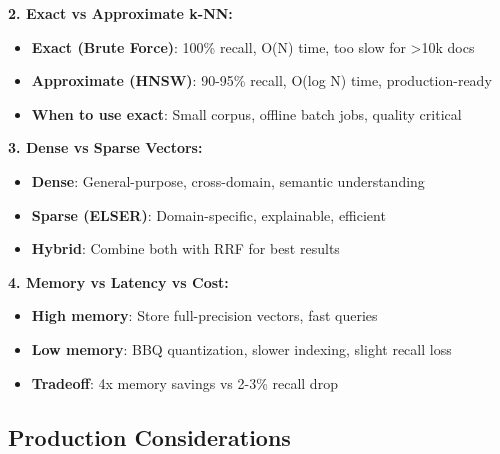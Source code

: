 \documentclass[10pt]{article}
\begin{document}
\textbf{2. Exact vs Approximate k-NN:}
\begin{itemize}
\item \textbf{Exact (Brute Force)}: 100\% recall, O(N) time, too slow for >10k docs
\item \textbf{Approximate (HNSW)}: 90-95\% recall, O(log N) time, production-ready
\item \textbf{When to use exact}: Small corpus, offline batch jobs, quality critical
\end{itemize}

\textbf{3. Dense vs Sparse Vectors:}
\begin{itemize}
\item \textbf{Dense}: General-purpose, cross-domain, semantic understanding
\item \textbf{Sparse (ELSER)}: Domain-specific, explainable, efficient
\item \textbf{Hybrid}: Combine both with RRF for best results
\end{itemize}

\textbf{4. Memory vs Latency vs Cost:}
\begin{itemize}
\item \textbf{High memory}: Store full-precision vectors, fast queries
\item \textbf{Low memory}: BBQ quantization, slower indexing, slight recall loss
\item \textbf{Tradeoff}: 4x memory savings vs 2-3\% recall drop
\end{itemize}

\subsection{Production Considerations}
\end{document}
